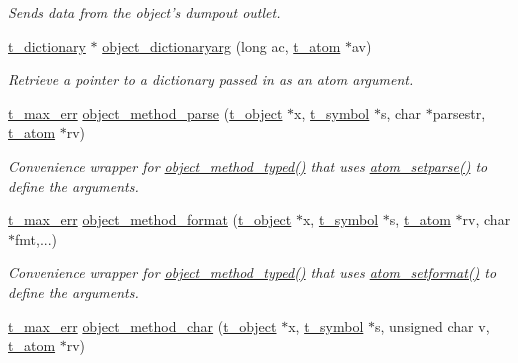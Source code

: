 \begin{DoxyCompactItemize}
\begin{DoxyCompactList}\small\item\em Sends data from the object's dumpout outlet. \item\end{DoxyCompactList}\item 
\hyperlink{structt__dictionary}{t\_\-dictionary} $\ast$ \hyperlink{group__obj_ga6122e56af8de90fa7aad43ee405c6bb6}{object\_\-dictionaryarg} (long ac, \hyperlink{structt__atom}{t\_\-atom} $\ast$av)
\begin{DoxyCompactList}\small\item\em Retrieve a pointer to a dictionary passed in as an atom argument. \item\end{DoxyCompactList}\item 
\hyperlink{group__datatypes_ga73edaae82b318855cc09fac994918165}{t\_\-max\_\-err} \hyperlink{group__obj_ga8c420370f84f178515540831cbe4e6d8}{object\_\-method\_\-parse} (\hyperlink{structt__object}{t\_\-object} $\ast$x, \hyperlink{structt__symbol}{t\_\-symbol} $\ast$s, char $\ast$parsestr, \hyperlink{structt__atom}{t\_\-atom} $\ast$rv)
\begin{DoxyCompactList}\small\item\em Convenience wrapper for \hyperlink{group__obj_ga443dee482af22e0fe83e68955d367226}{object\_\-method\_\-typed()} that uses \hyperlink{group__atom_ga55938aedb41a8f3565680cf29169dc70}{atom\_\-setparse()} to define the arguments. \item\end{DoxyCompactList}\item 
\hyperlink{group__datatypes_ga73edaae82b318855cc09fac994918165}{t\_\-max\_\-err} \hyperlink{group__obj_gab509bef31fc1bdf47c67525c0353e6d3}{object\_\-method\_\-format} (\hyperlink{structt__object}{t\_\-object} $\ast$x, \hyperlink{structt__symbol}{t\_\-symbol} $\ast$s, \hyperlink{structt__atom}{t\_\-atom} $\ast$rv, char $\ast$fmt,...)
\begin{DoxyCompactList}\small\item\em Convenience wrapper for \hyperlink{group__obj_ga443dee482af22e0fe83e68955d367226}{object\_\-method\_\-typed()} that uses \hyperlink{group__atom_ga7a00fdf0699ae5176d39d7ddc3529bf0}{atom\_\-setformat()} to define the arguments. \item\end{DoxyCompactList}\item 
\hyperlink{group__datatypes_ga73edaae82b318855cc09fac994918165}{t\_\-max\_\-err} \hyperlink{group__obj_ga046f517695486f4008ae9b25ce5e41d7}{object\_\-method\_\-char} (\hyperlink{structt__object}{t\_\-object} $\ast$x, \hyperlink{structt__symbol}{t\_\-symbol} $\ast$s, unsigned char v, \hyperlink{structt__atom}{t\_\-atom} $\ast$rv)

\end{DoxyCompactItemize}
